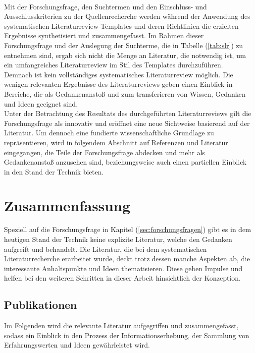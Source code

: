         \\
        Mit der Forschungsfrage, den Suchtermen und den Einschluss- und Ausschlusskriterien zu der Quellenrecherche werden während der Anwendung
        des systematischen Literaturreview-Templates und deren Richtlinien die erzielten Ergebnisse synthetisiert und zusammengefasst. Im Rahmen 
        dieser Forschungsfrage und der Auslegung der Suchterme, die in Tabelle (\ref{tab:slr}) zu entnehmen sind, ergab sich nicht die Menge an Literatur, 
        die notwendig ist, um ein umfangreiches Literaturreview im Stil des Templates durchzuführen. Demnach ist kein vollständiges systematisches Literaturreview 
        möglich. Die wenigen relevanten Ergebnisse des Literaturreviews geben einen Einblick in Bereiche, die als Gedankenanstoß und zum transferieren von 
        Wissen, Gedanken und Ideen geeignet sind. 
        \\
        \linebreak
        Unter der Betrachtung des Resultats des durchgeführten Literaturreviews gilt die Forschungsfrage als innovativ und eröffnet eine 
        neue Sichtweise basierend auf der Literatur. Um dennoch eine fundierte wissenschaftliche Grundlage zu repräsentieren, wird in 
        folgendem Abschnitt auf Referenzen und Literatur eingegangen, die Teile der Forschungsfrage abdecken und mehr als Gedankenanstoß 
        anzusehen sind, beziehungsweise auch einen partiellen Einblick in den Stand der Technik bieten. 

\section{Zusammenfassung} 
    Speziell auf die Forschungsfrage in Kapitel (\ref{sec:forschungsfragen}) gibt es in dem heutigen Stand der Technik keine explizite 
    Literatur, welche den Gedanken aufgreift und behandelt. Die Literatur, die bei dem systematischen Literaturrecherche erarbeitet wurde, 
    deckt trotz dessen manche Aspekten ab, die interessante Anhaltspunkte und Ideen thematisieren. Diese geben Impulse und helfen bei den weiteren 
    Schritten in dieser Arbeit hinsichtlich der Konzeption. 
    \\
    
    \subsection{Publikationen}
    \label{subsec:publications}
        Im Folgenden wird die relevante Literatur aufgegriffen und zusammengefasst, sodass ein Einblick in den Prozess der 
        Informationserhebung, der Sammlung von Erfahrungswerten und Ideen gewährleistet wird.
        

